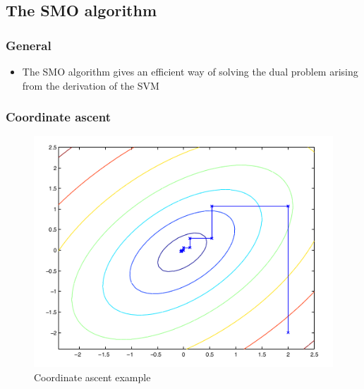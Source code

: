 \documentclass[11pt]{article}
\begin{document}
\subsection{The SMO algorithm}
\label{sec:org8f1a36c}
\subsubsection{General}
\label{sec:org2a1afef}
\begin{itemize}
\item The SMO algorithm gives an efficient way of solving the dual problem arising from the derivation of the SVM
\end{itemize}

\subsubsection{Coordinate ascent}
\label{sec:org29f6a64}
\begin{figure}[htbp]
\centering
\includegraphics[width=.9\linewidth]{Support Vector Machines/screenshot_2018-09-25_08-44-24.png}
\caption{\label{fig:org9fc88ba}
Coordinate ascent example}
\end{figure}
\end{document}
